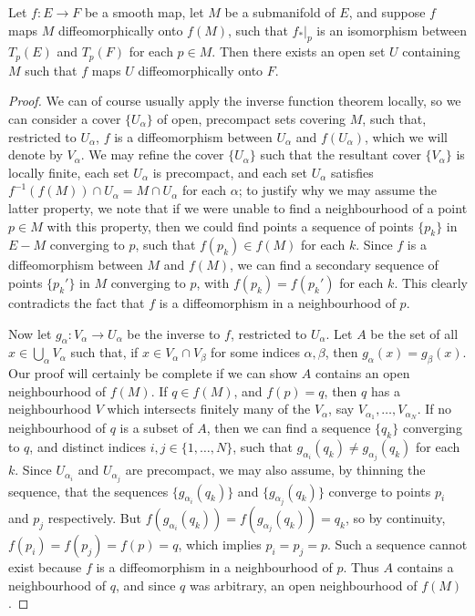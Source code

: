 \begin{lemma}
    Let $f: E \to F$ be a smooth map, let $M$ be a submanifold of $E$, and suppose $f$ maps $M$ diffeomorphically onto $f(M)$, such that $f_*|_p$ is an isomorphism between $T_p(E)$ and $T_p(F)$ for each $p \in M$. Then there exists an open set $U$ containing $M$ such that $f$ maps $U$ diffeomorphically onto $F$.
\end{lemma}
\begin{proof}
    We can of course usually apply the inverse function theorem locally, so we can consider a cover $\{ U_\alpha \}$ of open, precompact sets covering $M$, such that, restricted to $U_\alpha$, $f$ is a diffeomorphism between $U_\alpha$ and $f(U_\alpha)$, which we will denote by $V_\alpha$. We may refine the cover $\{ U_\alpha \}$ such that the resultant cover $\{ V_\alpha \}$ is locally finite, each set $U_\alpha$ is precompact, and each set $U_\alpha$ satisfies $f^{-1}(f(M)) \cap U_\alpha = M \cap U_\alpha$ for each $\alpha$; to justify why we may assume the latter property, we note that if we were unable to find a neighbourhood of a point $p \in M$ with this property, then we could find points a sequence of points $\{ p_k \}$ in $E - M$ converging to $p$, such that $f(p_k) \in f(M)$ for each $k$. Since $f$ is a diffeomorphism between $M$ and $f(M)$, we can find a secondary sequence of points $\{ p_k' \}$ in $M$ converging to $p$, with $f(p_k) = f(p_k')$ for each $k$. This clearly contradicts the fact that $f$ is a diffeomorphism in a neighbourhood of $p$.

    Now let $g_\alpha: V_\alpha \to U_\alpha$ be the inverse to $f$, restricted to $U_\alpha$. Let $A$ be the set of all $x \in \bigcup_\alpha V_\alpha$ such that, if $x \in V_\alpha \cap V_\beta$ for some indices $\alpha,\beta$, then $g_\alpha(x) = g_\beta(x)$. Our proof will certainly be complete if we can show $A$ contains an open neighbourhood of $f(M)$. If $q \in f(M)$, and $f(p) = q$, then $q$ has a neighbourhood $V$ which intersects finitely many of the $V_\alpha$, say $V_{\alpha_1}, \dots, V_{\alpha_N}$. If no neighbourhood of $q$ is a subset of $A$, then we can find a sequence $\{ q_k \}$ converging to $q$, and distinct indices $i,j \in \{ 1, \dots, N \}$, such that $g_{\alpha_i}(q_k) \neq g_{\alpha_j}(q_k)$ for each $k$. Since $U_{\alpha_i}$ and $U_{\alpha_j}$ are precompact, we may also assume, by thinning the sequence, that the sequences $\{ g_{\alpha_i}(q_k) \}$ and $\{ g_{\alpha_j}(q_k) \}$ converge to points $p_i$ and $p_j$ respectively. But $f(g_{\alpha_i}(q_k)) = f(g_{\alpha_j}(q_k)) = q_k$, so by continuity, $f(p_i) = f(p_j) = f(p) = q$, which implies $p_i = p_j = p$. Such a sequence cannot exist because $f$ is a diffeomorphism in a neighbourhood of $p$. Thus $A$ contains a neighbourhood of $q$, and since $q$ was arbitrary, an open neighbourhood of $f(M)$.
\end{proof}

